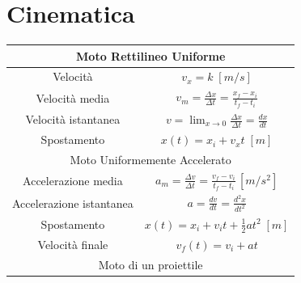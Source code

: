 \chapter*{Cinematica}

\begingroup
\setlength{\tabcolsep}{20pt} %
\renewcommand{\arraystretch}{2} %

\begin{tabular}{|c|c|}
    \hline
    \multicolumn{2}{|c|}{Moto Rettilineo Uniforme}\\

        \hline Velocità &
            $
                v_x = k \; [m/s]
            $
            \\

        \hline Velocità media &
            $
                v_m = \frac{\Delta x}{\Delta t} = \frac{x_f - x_i}{t_f - t_i}
            $
            \\

        \hline Velocità istantanea &
            $
                v = \lim_{x \to 0}  \frac{\Delta x}{\Delta t} = \frac{dx}{dt}
            $
            \\

        \hline Spostamento &
            $
                x(t) = x_i + v_xt \; [m]
            $
            \\
    \hline

    \multicolumn{2}{|c|}{Moto Uniformemente Accelerato} \\

        \hline Accelerazione media &
            $
                a_m = \frac{\Delta v}{\Delta t} = \frac{v_f - v_i}{t_f - t_i} 
                \, [m/s^2]
            $
            \\

        \hline Accelerazione istantanea &
            $
                a = \frac{dv}{dt} = \frac{d^2x}{dt^2}
            $
            \\

        \hline Spostamento &
            $
                x(t) = x_i + v_it + \frac{1}{2}at^2 \; [m]
            $
            \\

        \hline Velocità finale &
            $
                v_f(t) = v_{i} + at
            $
            \\
    
    \hline
    

    \multicolumn{2}{|c|}{Moto di un proiettile} \\


\end{tabular}
